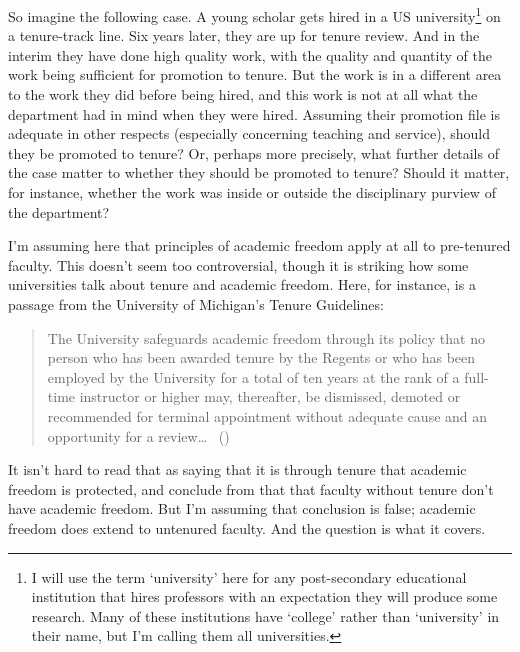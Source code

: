 \documentclass[
  11pt,
  letterpaper,
  DIV=11,
  numbers=noendperiod,
  twoside]{scrartcl}
\begin{document}
So imagine the following case. A young scholar gets hired in a US
university\footnote{I will use the term `university' here for any
  post-secondary educational institution that hires professors with an
  expectation they will produce some research. Many of these
  institutions have `college' rather than `university' in their name,
  but I'm calling them all universities.} on a tenure-track line. Six
years later, they are up for tenure review. And in the interim they have
done high quality work, with the quality and quantity of the work being
sufficient for promotion to tenure. But the work is in a different area
to the work they did before being hired, and this work is not at all
what the department had in mind when they were hired. Assuming their
promotion file is adequate in other respects (especially concerning
teaching and service), should they be promoted to tenure? Or, perhaps
more precisely, what further details of the case matter to whether they
should be promoted to tenure? Should it matter, for instance, whether
the work was inside or outside the disciplinary purview of the
department?

I'm assuming here that principles of academic freedom apply at all to
pre-tenured faculty. This doesn't seem too controversial, though it is
striking how some universities talk about tenure and academic freedom.
Here, for instance, is a passage from the University of Michigan's
Tenure Guidelines:

\begin{quote}
The University safeguards academic freedom through its policy that no
person who has been awarded tenure by the Regents or who has been
employed by the University for a total of ten years at the rank of a
full-time instructor or higher may, thereafter, be dismissed, demoted or
recommended for terminal appointment without adequate cause and an
opportunity for a review\ldots{} ~()
\end{quote}

It isn't hard to read that as saying that it is through tenure that
academic freedom is protected, and conclude from that that faculty
without tenure don't have academic freedom. But I'm assuming that
conclusion is false; academic freedom does extend to untenured faculty.
And the question is what it covers.
\end{document}

